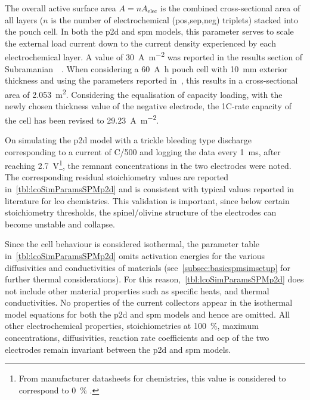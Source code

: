 The  overall  active  surface  area  $A  =  n  A_\text{elec}$  is  the  combined
cross-sectional  area  of all  layers  ($n$  is  the number  of  electrochemical
(pos,sep,neg)  triplets) stacked  into the  pouch  cell. In  both the  \gls{p2d}
and  \gls{spm}  models,  this  parameter  serves  to  scale  the  external  load
current  down  to  the  current  density  experienced  by  each  electrochemical
layer. A value of  \approx\SI{30}{\ampere\per\meter\squared} was reported in the
results section of  Subramanian~\etal{}~\cite{Subramanian2009}. When considering
a \SI{60}{\ampere\hour} pouch cell with \SI{10}{\milli\meter} exterior thickness
and  using  the  parameters  reported  in~\cite{Subramanian2009},  this  results
in  a cross-sectional  area of  \SI{2.053}{\meter\squared}.  Considering  the
equalisation of capacity  loading, with the newly chosen thickness  value of the
negative  electrode, the  1C-rate  capacity  of the  cell  has  been revised  to
\SI{29.23}{\ampere\per\meter\squared}.

On  simulating  the \gls{p2d}  model  with  a  trickle bleeding  type  discharge
corresponding   to   a  current   of   C/500   and   logging  the   data   every
\SI{1}{\milli\second}, after reaching \SI{2.7}{\volt}\footnote{From manufacturer
    datasheets  for   chemistries,  this value  is considered  to
correspond to \SI{0}{\percent} .}, the remnant concentrations
in  the two  electrodes  were noted.  The  corresponding residual  stoichiometry
values  are reported  in~\cref{tbl:lcoSimParamsSPMp2d}  and  is consistent  with
typical values reported in literature for \gls{lco} chemistries.  This validation is  important, since below  certain stoichiometry
thresholds, the spinel/olivine  structure of the electrodes  can become unstable
and  collapse.

Since   the   cell   behaviour   is   considered   isothermal,   the   parameter
table     in~\cref{tbl:lcoSimParamsSPMp2d}     omits     activation     energies
for    the   various    diffusivities    and    conductivities   of    materials
(see~\cref{subsec:basicspmsimsetup}  for  further thermal  considerations).  For
this  reason,~\cref{tbl:lcoSimParamsSPMp2d}  does  not  include  other  material
properties such  as specific  heats, and  thermal conductivities.  No properties
of  the  current  collectors  appear  in  the  isothermal  model  equations  for
both  the \gls{p2d}  and  \gls{spm}  models and  hence  are  omitted. All  other
electrochemical  properties,   \viz{}  stoichiometries   at  \SI{100}{\percent},
maximum concentrations, diffusivities, reaction  rate coefficients and \gls{ocp}
of  the two  electrodes remain  invariant  between the  \gls{p2d} and  \gls{spm}
models. \nopagebreak[4]

